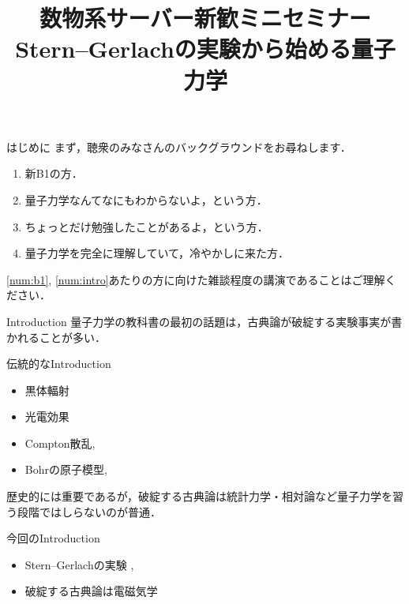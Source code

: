 \documentclass[dvipdfmx]{beamer}
\author[@tos\_shiii]{}
\institute[Twitter]{}
\title[\textcolor{white}{SGEから始めるQM}]{数物系サーバー新歓ミニセミナー\\
Stern--Gerlachの実験から始める量子力学}
\theoremstyle{break}
\begin{document}
\begin{frame}
		\maketitle
\end{frame}


\begin{frame}{はじめに}
		まず，聴衆のみなさんのバックグラウンドをお尋ねします．

		\begin{enumerate}
				[default]
				\item 新B1の方．\label{num:b1}
				\item 量子力学なんてなにもわからないよ，という方．\label{num:intro}
				\item ちょっとだけ勉強したことがあるよ，という方．
				\item 量子力学を完全に理解していて，冷やかしに来た方．
		\end{enumerate}

		\ref{num:b1}, \ref{num:intro}あたりの方に向けた雑談程度の講演であることはご理解ください．
\end{frame}


\begin{frame}{Introduction}
		量子力学の教科書の最初の話題は，古典論が破綻する実験事実が書かれることが多い．
		\begin{block}{伝統的なIntroduction}
		\begin{itemize}
				\item 黒体輻射\cite[\S1.1]{BN10398292}
				\item 光電効果\cite[\S1.2]{BN10398292}
				\item Compton散乱\cite[\S1.3]{BN10398292}, \cite[\S1.1, (1)]{BN0611143X}
				\item Bohrの原子模型\cite[\S1.6]{BN10398292}, \cite[\S1.1, (2)]{BN0611143X}
		\end{itemize}
		歴史的には重要であるが，破綻する古典論は統計力学・相対論など量子力学を習う段階ではしらないのが普通．
		\end{block}
		\begin{alertblock}{今回のIntroduction}
				\begin{itemize}
				\item Stern--Gerlachの実験 \cite{BC01962771}, \cite{BC08412531}
				\item 破綻する古典論は電磁気学
				\end{itemize}
		\end{alertblock}
\end{frame}
\end{document}
